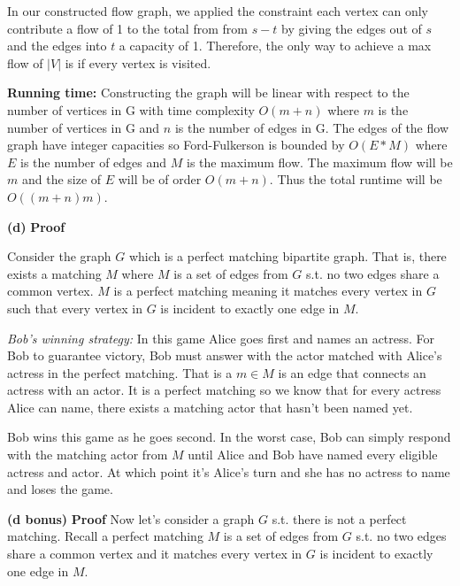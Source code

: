 \documentclass[11pt]{article}
\renewcommand\part[1]{\vspace{.10in}\textbf{(#1)}}
\newcommand\runtime{\vspace{.10in}\textbf{Running time: }}
\begin{document}
In our constructed flow graph, we applied the constraint each vertex can only contribute a flow of 1 to the total from from $s-t$ by giving the edges out of $s$ and the edges into $t$ a capacity of 1. Therefore, the only way to achieve a max flow of $|V|$ is if every vertex is visited. 

\runtime Constructing the graph will be linear with respect to the number of vertices in G with time complexity $O(m + n)$ where $m$ is the number of vertices in G and $n$ is the number of edges in G. The edges of the flow graph have integer capacities so Ford-Fulkerson is bounded by $O(E * M)$ where $E$ is the number of edges and $M$ is the maximum flow. The maximum flow will be $m$ and the size of $E$ will be of order $O(m + n)$. Thus the total runtime will be $O((m + n)m)$.


\part{d} \textbf{Proof} 

Consider the graph $G$ which is a perfect matching bipartite graph. That is, there exists a matching $M$ where $M$ is a set of edges from $G$ s.t. no two edges share a common vertex. $M$ is a perfect matching meaning it matches every vertex in $G$ such that every vertex in $G$ is incident to exactly one edge in $M$.

\textit{Bob's winning strategy:} In this game Alice goes first and names an actress. For Bob to guarantee victory, Bob must answer with the actor matched with Alice's actress in the perfect matching. That is a $m \in M$ is an edge that connects an actress with an actor. It is a perfect matching so we know that for every actress Alice can name, there exists a matching actor that hasn't been named yet.

Bob wins this game as he goes second. In the worst case, Bob can simply respond with the matching actor from $M$ until Alice and Bob have named every eligible actress and actor. At which point it's Alice's turn and she has no actress to name and loses the game.

\part{d bonus} \textbf{Proof}
Now let's consider a graph $G$ s.t. there is not a perfect matching. Recall a perfect matching $M$ is a set of edges from $G$ s.t. no two edges share a common vertex and it matches every vertex in $G$ is incident to exactly one edge in $M$.
\end{document}
